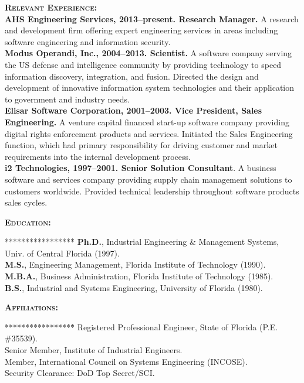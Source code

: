 \documentclass{sbir}
\begin{document}
{\vspace{-6pt}
\textbf{\textsc{Relevant Experience:}}~\\
{\bfseries AHS Engineering Services, 2013--present. Research Manager.} A research and development firm offering expert engineering services in areas including software engineering and information security.~\\
{\bfseries Modus Operandi, Inc., 2004--2013. Scientist.} A software company serving the US defense and intelligence community by providing technology to speed information discovery, integration, and fusion. Directed the design and development of innovative information system technologies and their application to government and industry needs.~\\
{\bfseries Elisar Software Corporation, 2001--2003. Vice President, Sales Engineering.} A venture capital financed start-up software company providing digital rights enforcement products and services. Initiated the Sales Engineering function, which had primary responsibility for driving customer and market requirements into the internal development process.~\\
{\bfseries i2 Technologies, 1997--2001. Senior Solution Consultant}. A business software and services company providing supply chain management solutions to customers worldwide. Provided technical leadership throughout software products sales cycles.

\vspace{-6pt}
\textbf{\textsc{Education:}}
\vspace{-30pt}
\begin{tabbing}*****************\=\kill
 \> {\bfseries Ph.D.}, Industrial Engineering \& Management Systems, Univ. of Central Florida (1997). \\
 \> {\bfseries M.S.}, Engineering Management, Florida Institute of Technology (1990). \\
 \> {\bfseries M.B.A.}, Business Administration, Florida Institute of Technology (1985). \\
 \> {\bfseries B.S.}, Industrial and Systems Engineering, University of Florida (1980).
\end{tabbing}

\vspace{-12pt}
\textbf{\textsc{Affiliations:}}
\vspace{-30pt}
\begin{tabbing}*****************\=\kill
\> Registered Professional Engineer, State of Florida (P.E. \#35539). \\
\> Senior Member, Institute of Industrial Engineers. \\
\> Member, International Council on Systems Engineering (INCOSE). \\
\> Security Clearance: DoD Top Secret/SCI.
\end{tabbing}
\vspace{-12pt}

}
\end{document}

